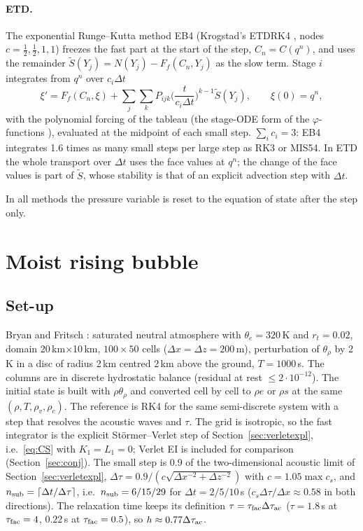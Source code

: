 \documentclass[11pt,a4paper]{article}
\newcommand{\dtau}{\Delta\tau}
\newcommand{\dt}{\Delta t}
\newcommand{\fs}{\xi}         %
\begin{document}
\paragraph{ETD.} The exponential Runge--Kutta method EB4 (Krogstad's ETDRK4 \cite{krogstad}, nodes
$c=\tfrac12,\tfrac12,1,1$) freezes the fast part at the start of the step, $C_n=C(q^n)$, and uses the remainder
$\tilde S(Y_j)=N(Y_j)-F_f(C_n,Y_j)$ as the slow term. Stage $i$ integrates from $q^n$ over $c_i\dt$
\[
\fs'=F_f(C_n,\fs)+\sum_j\sum_kP_{ijk}\Big(\frac t{c_i\dt}\Big)^{k-1}\tilde S(Y_j),\qquad\fs(0)=q^n,
\]
with the polynomial forcing of the tableau (the stage-ODE form of the $\varphi$-functions
\cite{hochbruck}), evaluated at the midpoint of each small step. $\sum_ic_i=3$: EB4 integrates 1.6 times as
many small steps per large step as RK3 or MIS54. In ETD the whole transport over $\dt$ uses the face
values at $q^n$; the change of the face values is part of $\tilde S$, whose stability is that of an
explicit advection step with $\dt$.

In all methods the pressure variable is reset to the equation of state after the step only.

\section{Moist rising bubble}\label{sec:bubble}
\subsection{Set-up}
Bryan and Fritsch \cite{bryanfritsch}: saturated neutral atmosphere with $\theta_e=320$\,K and $r_t=0.02$,
domain 20\,km$\times$10\,km, $100\times50$ cells ($\Delta x=\Delta z=200$\,m), perturbation of $\theta_\rho$ by 2\,K in a disc
of radius 2\,km centred 2\,km above the ground, $T=1000$\,s. The columns are in discrete hydrostatic
balance (residual at rest $\le2\cdot10^{-12}$). The initial state is built with $\rho\theta_\rho$ and converted
cell by cell to $\rho e$ or $\rho s$ at the same $(\rho,T,\rho_v,\rho_c)$. The reference is RK4 for the same
semi-discrete system with a step that resolves the acoustic waves and $\tau$. The grid is isotropic, so
the fast integrator is the explicit Störmer--Verlet step of Section~\ref{sec:verletexpl}, i.e.\ \eqref{eq:CS} with $K_1=L_1=0$; Verlet EI is
included for comparison (Section~\ref{sec:conj}). The small step is 0.9 of the two-dimensional acoustic limit of
Section~\ref{sec:verletexpl}, $\dtau=0.9/(c\sqrt{\Delta x^{-2}+\Delta z^{-2}})$ with $c=1.05\max c_s$, and $n_{\rm sub}=\lceil\dt/\dtau\rceil$,
i.e.\ $n_{\rm sub}=6/15/29$ for $\dt=2/5/10$\,s ($c_s\dtau/\Delta x\approx0.58$ in both directions). The relaxation time keeps
its definition $\tau=\tau_{\rm fac}\dtau_{\rm ac}$ ($\tau=1.8$\,s at $\tau_{\rm fac}=4$, $0.22$\,s at $\tau_{\rm fac}=0.5$), so $h\approx0.77\dtau_{\rm ac}$.
\end{document}
